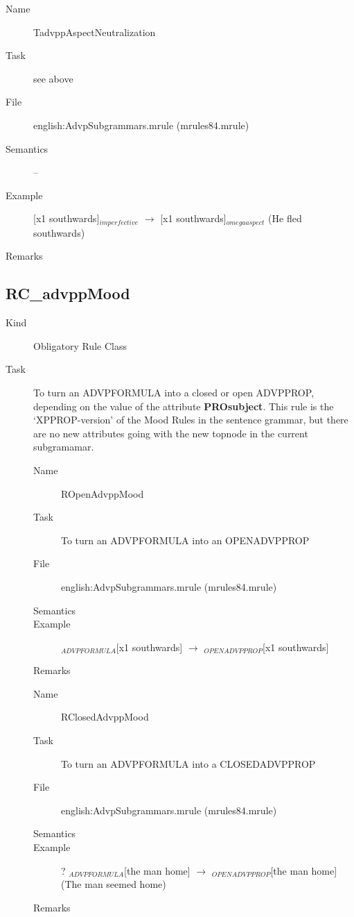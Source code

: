 \begin{description}
\begin{description}
\vspace{1 cm}
\begin{description}
\item[Name] TadvppAspectNeutralization
\item[Task] see above
\item[File] english:AdvpSubgrammars.mrule (mrules84.mrule)
\item[Semantics] --
\item[Example] [x1 southwards]$_{imperfective}$ $\rightarrow$ [x1 
southwards]$_{omegaaspect}$ (He fled southwards)
\item[Remarks]
\end{description}

\end{description}

\newpage
\subsection{RC\_advppMood}
\begin{description}
\item[Kind] Obligatory Rule Class
\item[Task] To turn an ADVPFORMULA into a closed or open ADVPPROP, depending 
on the value of the attribute {\bf PROsubject}. This rule is the 
`XPPROP-version' of the Mood Rules in the sentence grammar, but there are no 
new attributes going with the new topnode in the current subgramamar.

\vspace{1 cm}
\begin{description}
\item[Name] ROpenAdvppMood
\item[Task] To turn an ADVPFORMULA into an OPENADVPPROP
\item[File] english:AdvpSubgrammars.mrule (mrules84.mrule)
\item[Semantics] 
\item[Example] $_{ADVPFORMULA}$[x1 southwards] $\rightarrow$ 
$_{OPENADVPPROP}$[x1 southwards]
\item[Remarks]
\end{description}

\vspace{1 cm}
\begin{description}
\item[Name] RClosedAdvppMood
\item[Task] To turn an ADVPFORMULA into a CLOSEDADVPPROP
\item[File] english:AdvpSubgrammars.mrule (mrules84.mrule)
\item[Semantics] 
\item[Example] ? $_{ADVPFORMULA}$[the man home] $\rightarrow$ 
$_{OPENADVPPROP}$[the man home] (The man seemed home)
\item[Remarks] 
\end{description}


\end{description}
\end{description}
